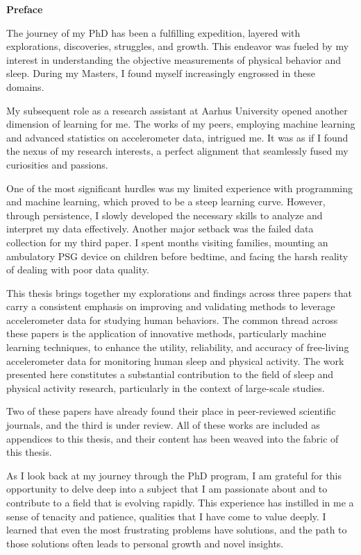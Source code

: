 \documentclass[
  9pt,
]{article}
\begin{document}
\textsf{\textbf{\Large{Preface}}}

\vspace*{\baselineskip}

The journey of my PhD has been a fulfilling expedition, layered with explorations, discoveries, struggles, and growth. This endeavor was fueled by my interest in understanding the objective measurements of physical behavior and sleep. During my Masters, I found myself increasingly engrossed in these domains.

My subsequent role as a research assistant at Aarhus University opened another dimension of learning for me. The works of my peers, employing machine learning and advanced statistics on accelerometer data, intrigued me. It was as if I found the nexus of my research interests, a perfect alignment that seamlessly fused my curiosities and passions.

One of the most significant hurdles was my limited experience with programming and machine learning, which proved to be a steep learning curve. However, through persistence, I slowly developed the necessary skills to analyze and interpret my data effectively. Another major setback was the failed data collection for my third paper. I spent months visiting families, mounting an ambulatory PSG device on children before bedtime, and facing the harsh reality of dealing with poor data quality.

This thesis brings together my explorations and findings across three papers that carry a consistent emphasis on improving and validating methods to leverage accelerometer data for studying human behaviors. The common thread across these papers is the application of innovative methods, particularly machine learning techniques, to enhance the utility, reliability, and accuracy of free-living accelerometer data for monitoring human sleep and physical activity. The work presented here constitutes a substantial contribution to the field of sleep and physical activity research, particularly in the context of large-scale studies.

Two of these papers have already found their place in peer-reviewed scientific journals, and the third is under review. All of these works are included as appendices to this thesis, and their content has been weaved into the fabric of this thesis.

As I look back at my journey through the PhD program, I am grateful for this opportunity to delve deep into a subject that I am passionate about and to contribute to a field that is evolving rapidly. This experience has instilled in me a sense of tenacity and patience, qualities that I have come to value deeply. I learned that even the most frustrating problems have solutions, and the path to those solutions often leads to personal growth and novel insights.
\end{document}
